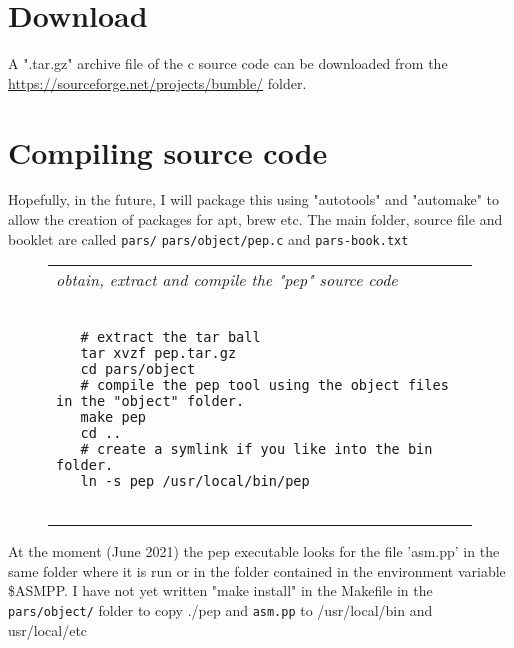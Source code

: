 \documentclass[a4paper,12pt]{article}
\begin{document}
\section{Download}

  A ".tar.gz" archive file of the c source code can be downloaded from
  the \url{https://sourceforge.net/projects/bumble/} folder.
 
\section{Compiling source code}

  Hopefully, in the future, I will package this using "autotools" and
  "automake" to allow the creation of packages for apt, brew etc. The main
  folder, source file and booklet are called \texttt{pars/} \texttt{pars/object/pep.c} and \texttt{pars-book.txt}
 \begin{figure}
 \begin{tabular}{ l }
 \emph{ obtain, extract and compile the "pep" source code  } \\ 
 \begin{lstlisting}[breaklines] 

   # extract the tar ball
   tar xvzf pep.tar.gz
   cd pars/object
   # compile the pep tool using the object files in the "object" folder.
   make pep
   cd ..
   # create a symlink if you like into the bin folder.
   ln -s pep /usr/local/bin/pep
  
 \end{lstlisting} 
 \end{tabular} 

 \end{figure}

  At the moment (June 2021) the pep executable looks for the file
  'asm.pp' in the same folder where it is run or in the folder contained
  in the environment variable \$ASMPP. I have not yet written "make install"
  in the Makefile in the \texttt{pars/object/} folder to copy ./pep and \texttt{asm.pp} to
  /usr/local/bin and usr/local/etc
\end{document}
